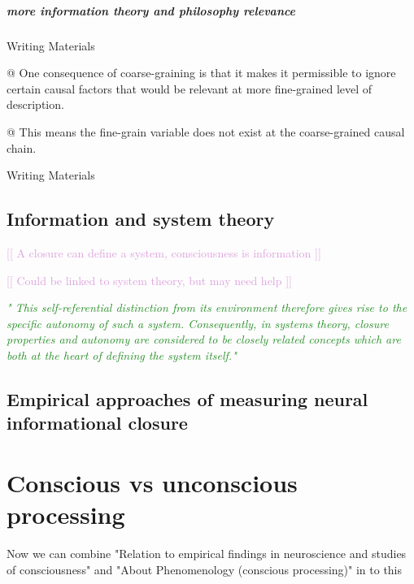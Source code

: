 \documentclass[utf8]{article}
\newenvironment{writingMaterials}
			{	
			\begin{tcolorbox}[size=small, colframe=black!20!white, toprule=1mm]
				Writing Materials
			\end{tcolorbox}
			
			\begin{easylist}[itemize]		
			}
			{
			\end{easylist}
			\begin{tcolorbox}[size=small, bottomrule=1mm, halign=flush right, colframe=black!20!white]
				Writing Materials
			\end{tcolorbox}			
			}
\newcommand{\rewrite}[1]{\textcolor{ForestGreen}{\textit{"#1"}}\newline}
\newcommand{\idea}[2][Plum]{\noindent
				\textcolor{#1}{[[ #2 ]]}}
\newcommand{\ideaBox}[1]{
				\begin{tcolorbox}[%
					width=12cm,
					sharp corners=downhill, 
					hyphenationfix, 
					arc=8pt,
					colback=Thistle!50!white, 
					flush right,
					halign=flush right,
					]%
					#1
				\end{tcolorbox}
			}
\begin{document}
		
		
		
		
		
		\subparagraph{more information theory and philosophy relevance}
			\begin{writingMaterials}
				@ One consequence of coarse-graining is that it makes it permissible to ignore certain causal factors that would be relevant at more fine-grained level of description. \cite{price2007causation}
				
				@ This means the fine-grain variable does not exist at the coarse-grained causal chain. 
			\end{writingMaterials}
		
		
		

		\subsection{Information and system theory}
			\idea{A closure can define a system, consciousness is information}
			
			\idea{Could be linked to system theory, but may need help}
		
			\rewrite{
				This self-referential distinction from its environment therefore gives rise to the specific autonomy of such a system. Consequently, in systems theory, closure properties and autonomy are considered to be closely related concepts which are both at the heart of defining the system itself.}
			
			
			
		\subsection{Empirical approaches of measuring neural informational closure}
		
		

	\section{Conscious vs unconscious processing}
		\ideaBox{Now we can combine "Relation to empirical findings in neuroscience and studies of consciousness" and "About Phenomenology (conscious processing)" in to this}
	
\end{document}
